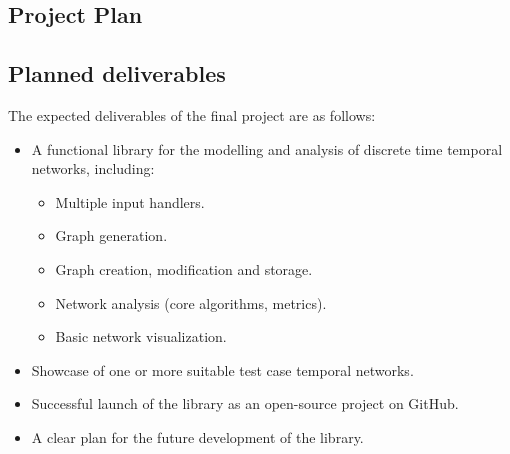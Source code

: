 \begin{plan}
\section{Project Plan}
\subsection{Planned deliverables}
The expected deliverables of the final project are as follows:
\begin{itemize}
  \item A functional library for the modelling and analysis of discrete time temporal networks, including:
  \begin{itemize}
      \item Multiple input handlers.
      \item Graph generation.
      \item Graph creation, modification and storage.
      \item Network analysis (core algorithms, metrics).
      \item Basic network visualization.
  \end{itemize}
  \item Showcase of one or more suitable test case temporal networks.
  \item Successful launch of the library as an open-source project on GitHub.
  \item A clear plan for the future development of the library.
\end{itemize}

\end{plan}
